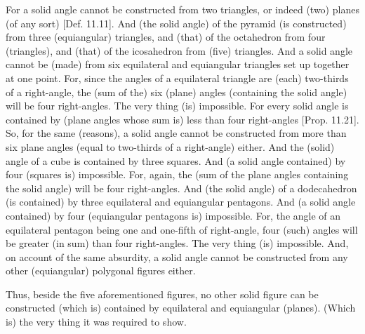 \begin{Parallel}{}{}
{For a solid angle cannot be constructed from two triangles, or indeed (two) planes (of any sort) [Def. 11.11]. And (the solid angle) of the
pyramid (is constructed) from three (equiangular) triangles, and (that) of the octahedron
from four (triangles), and (that) of the icosahedron from (five) triangles. 
And a solid angle cannot be (made) from six equilateral and
equiangular triangles set up together at one point. For, since the angles of a
equilateral triangle are (each)  two-thirds of a right-angle, the (sum of the)
six  (plane) angles (containing the solid angle) will be four right-angles. The very thing (is) impossible.
For every solid angle is contained by (plane angles whose sum is) less than four right-angles [Prop. 11.21].  So, for the same (reasons), a solid angle cannot be constructed from more than six  plane angles (equal to two-thirds of a right-angle) either. And the (solid) angle of a cube
is contained by three squares. And (a solid angle contained) by four
(squares is) impossible. For, again, the (sum of the plane angles
containing the solid angle) will be four right-angles. And (the solid angle)
of a dodecahedron (is contained) by three equilateral and equiangular
pentagons. And (a solid angle contained) by four (equiangular
pentagons is) impossible. For, the angle of an equilateral
pentagon being one and one-fifth of right-angle, four (such) angles will be
greater (in sum) than four right-angles. The very thing (is) impossible. And, on account of the same absurdity, a solid angle cannot be constructed from any other
(equiangular) polygonal figures either.

Thus, beside the five aforementioned figures, no other solid figure can be constructed (which is) contained by equilateral and equiangular (planes).
(Which is) the very thing it was required to show.}
\end{Parallel}

